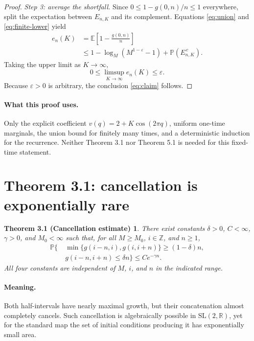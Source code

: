 \documentclass[11pt,a4paper]{article}
\newtheorem*{cancellation}{Theorem 3.1 (Cancellation estimate)}
\newcommand{\R}{\mathbb{R}}
\newcommand{\Z}{\mathbb{Z}}
\newcommand{\PP}{\mathbb{P}}
\newcommand{\EE}{\mathbb{E}}
\begin{document}
\begin{proof}
\smallskip
\noindent\emph{Step 3: average the shortfall.}
Since $0\le1-g(0,n)/n\le1$ everywhere, split the expectation between $E_{n,K}$ and its complement. Equations \eqref{eq:union} and \eqref{eq:finite-lower} yield
\begin{align*}
 e_n(K)
 &=\EE\left[1-\frac{g(0,n)}n\right]\\
 &\le1-\log_M(M^{1-\varepsilon}-1)+\PP(E_{n,K}^{\,c}).
\end{align*}
Taking the upper limit as $K\to\infty$,
\[
 0\le\limsup_{K\to\infty}e_n(K)\le\varepsilon.
\]
Because $\varepsilon>0$ is arbitrary, the conclusion \eqref{eq:claim} follows.
\end{proof}

\paragraph{What this proof uses.}
Only the explicit coefficient $v(q)=2+K\cos(2\pi q)$, uniform one-time marginals, the union bound for finitely many times, and a deterministic induction for the recurrence. Neither Theorem 3.1 nor Theorem 5.1 is needed for this fixed-time statement.

\section{Theorem 3.1: cancellation is exponentially rare}

\begin{cancellation}
There exist constants $\delta>0$, $C<\infty$, $\gamma>0$, and $M_0<\infty$ such that, for all $M\ge M_0$, $i\in\Z$, and $n\ge1$,
\begin{equation}\label{eq:cancel}
\boxed{\begin{aligned}
\PP\bigl\{\;&\min\{g(i-n,i),g(i,i+n)\}\ge(1-\delta)n,\\[-2pt]
           &g(i-n,i+n)\le\delta n\bigr\}
\le Ce^{-\gamma n}.
\end{aligned}}
\end{equation}
All four constants are independent of $M$, $i$, and $n$ in the indicated range.
\end{cancellation}

\paragraph{Meaning.} Both half-intervals have nearly maximal growth, but their concatenation almost completely cancels. Such cancellation is algebraically possible in $\mathrm{SL}(2,\R)$, yet for the standard map the set of initial conditions producing it has exponentially small area.
\end{document}
